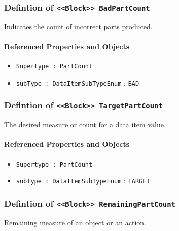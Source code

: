 \subsubsection{Defintion of \texttt{<<Block>> BadPartCount}}
  \label{type:BadPartCount}

\FloatBarrier

Indicates the count of incorrect parts produced.

\FloatBarrier
\paragraph{Referenced Properties and Objects}

\begin{itemize}
\item \texttt{Supertype : PartCount}

\item \texttt{subType : DataItemSubTypeEnum} : \texttt{BAD}

\end{itemize}
\FloatBarrier
\subsubsection{Defintion of \texttt{<<Block>> TargetPartCount}}
  \label{type:TargetPartCount}

\FloatBarrier

The desired measure or count for a data item value.

\FloatBarrier
\paragraph{Referenced Properties and Objects}

\begin{itemize}
\item \texttt{Supertype : PartCount}

\item \texttt{subType : DataItemSubTypeEnum} : \texttt{TARGET}

\end{itemize}
\FloatBarrier
\subsubsection{Defintion of \texttt{<<Block>> RemainingPartCount}}
  \label{type:RemainingPartCount}

\FloatBarrier

Remaining measure of an object or an action.

